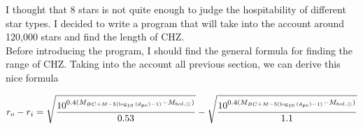 \documentclass{article}
\begin{document}
I thought that 8 stars is not quite enough to judge the hospitability of different star types. I decided to write a program that will take into the account around 120,000 stars and find the length of CHZ.\\

Before introducing the program, I should find the general formula for finding the range of CHZ. Taking into the account all previous section, we can derive this nice formula

\begin{equation}
  r_o - r_i = \sqrt{\frac{10^{0.4(M_{BC + M - 5(\log_{10}{(d_{pc})}-1)} - M_{bol, \odot})}}{0.53}} - \sqrt{\frac{10^{0.4(M_{BC + M - 5(\log_{10}{(d_{pc})}-1)} - M_{bol, \odot})}}{1.1}}\\
  \end{equation}










\newpage


  
\end{document}
